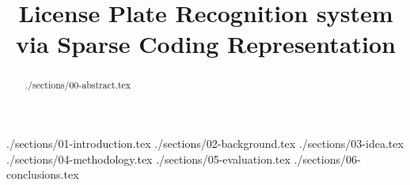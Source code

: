 \documentclass[10pt,conference,compsocconf]{styles/IEEEtran}
\def\SECDIR{./sections}            %
\def\STYDIR{./styles}            %
\begin{document}
%
\title{License Plate Recognition system via Sparse Coding Representation}

\author{
}


\maketitle


\begin{abstract}
 \SECDIR/00-abstract.tex
\end{abstract}


 \SECDIR/01-introduction.tex
 \SECDIR/02-background.tex
 \SECDIR/03-idea.tex
 \SECDIR/04-methodology.tex
 \SECDIR/05-evaluation.tex
 \SECDIR/06-conclusions.tex




\balance



\end{document}
